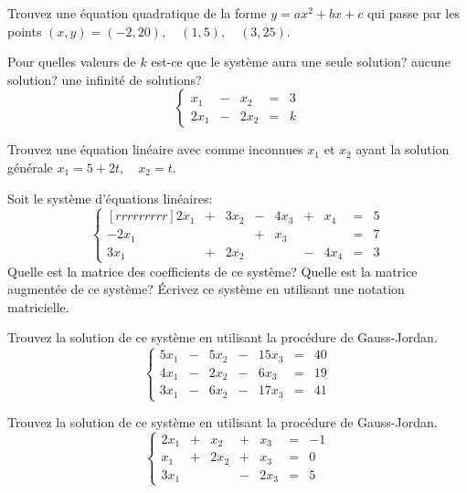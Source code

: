 \begin{TwoCol}
\begin{exercice}
	Trouvez une équation quadratique de la forme $y=ax^2 + bx + c$ qui passe par
	les points $(x,y) = (-2,20), \quad (1,5), \quad (3,25)$.
\end{exercice}


\begin{exercice}
	Pour quelles valeurs de $k$ est-ce que le système aura
	 une seule solution?
	 aucune solution?
	 une infinité de solutions?
	\[
	\left\{\begin{matrix}
	x_1 &-& x_2 &=& 3 \\
	2x_1 &-& 2x_2  &=& k
	\end{matrix}
	\right.
	\]
\end{exercice}

\begin{exercice}
	Trouvez une équation linéaire avec comme inconnues $x_1$ et $x_2$ ayant la solution
	générale $x_1=5+2t, \quad x_2=t$.
\end{exercice}

\begin{exercice}
	Soit le système d'équations linéaires:
	\[
	\left\{\begin{matrix}[rrrrrrrrr]
	2x_1 &+& 3x_2 &-& 4x_3 &+& x_4 &=& 5\\
	-2x_1 &&&+&x_3&&&=&7\\
	3x_1 &+& 2x_2 &&&-&4x_4&=& 3
	\end{matrix}
	\right.
	\]
 Quelle est la matrice des coefficients de ce système?
 Quelle est la matrice augmentée de ce système?
 Écrivez ce système en utilisant une notation matricielle.
\end{exercice}

\begin{exercice}
	Trouvez la solution de ce système en utilisant la procédure de Gauss-Jordan.
	\[
	\left\{\begin{matrix}
 	5x_1 &-& 5x_2 &-& 15x_3&=& 40\\
	4x_1 &-& 2x_2 &-& 6x_3&=&19\\
	3x_1 &-& 6x_2 &-& 17x_3&=& 41
	\end{matrix}
	\right.
	\]
\end{exercice}

\begin{exercice}
	Trouvez la solution de ce système en utilisant la procédure de Gauss-Jordan.
	\[
	\left\{\begin{matrix}
 	2x_1 &+& x_2 &+& x_3&=& -1\\
	 x_1 &+& 2x_2 &+& x_3&=&0\\
	3x_1 &&  &-& 2x_3&=& 5
	\end{matrix}
	\right.
	\]
\end{exercice}



\end{TwoCol}
